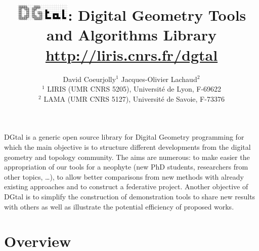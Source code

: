 \documentclass[11pt, a4paper]{article}
\date{}
\title{\includegraphics[width=0.2\textwidth]{dgtal-logo}:
  Digital Geometry Tools and Algorithms Library\\
\url{http://liris.cnrs.fr/dgtal}}
\author{David Coeurjolly$^1$ \qquad \qquad Jacques-Olivier Lachaud$^2$ \\
${}^1$ LIRIS (UMR CNRS 5205), Universit\'{e} de Lyon, F-69622 \\
${}^2$ LAMA (UMR CNRS 5127), Universit\'{e} de Savoie, F-73376\\
}
\begin{document}
\maketitle

DGtal is a generic open source library for Digital Geometry
programming for which the main objective is to structure different
developments from the digital geometry and topology community. The
aims are numerous: to make easier the appropriation of our tools for a
neophyte (new PhD students, researchers from other topics, …), to
allow better comparisons from new methods with already existing
approaches and to construct a federative project. Another objective of
DGtal is to simplify the construction of demonstration tools to share
new results with others as well as illustrate the potential efficiency
of proposed works.

\section*{Overview}
\end{document}
